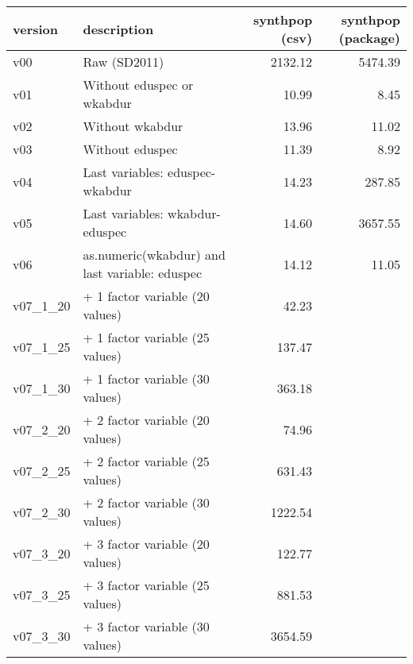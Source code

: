 \begin{tabular}{llrr}
  \toprule
version & description & synthpop (csv) & synthpop (package) \\ 
  \midrule
v00 & Raw (SD2011) & 2132.12 & 5474.39 \\ 
  v01 & Without eduspec or wkabdur & 10.99 & 8.45 \\ 
  v02 & Without wkabdur & 13.96 & 11.02 \\ 
  v03 & Without eduspec & 11.39 & 8.92 \\ 
  v04 & Last variables: eduspec-wkabdur & 14.23 & 287.85 \\ 
  v05 & Last variables: wkabdur-eduspec & 14.60 & 3657.55 \\ 
  v06 & as.numeric(wkabdur) and last variable: eduspec & 14.12 & 11.05 \\ 
  v07\_1\_20 & + 1 factor variable (20 values) & 42.23 &  \\ 
  v07\_1\_25 & + 1 factor variable (25 values) & 137.47 &  \\ 
  v07\_1\_30 & + 1 factor variable (30 values) & 363.18 &  \\ 
  v07\_2\_20 & + 2 factor variable (20 values) & 74.96 &  \\ 
  v07\_2\_25 & + 2 factor variable (25 values) & 631.43 &  \\ 
  v07\_2\_30 & + 2 factor variable (30 values) & 1222.54 &  \\ 
  v07\_3\_20 & + 3 factor variable (20 values) & 122.77 &  \\ 
  v07\_3\_25 & + 3 factor variable (25 values) & 881.53 &  \\ 
  v07\_3\_30 & + 3 factor variable (30 values) & 3654.59 &  \\ 
   \bottomrule
\end{tabular}
